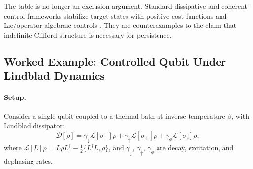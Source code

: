 \documentclass[12pt,a4paper,openany]{book}
\begin{document}
\begin{table}[h]
\centering
{}
\caption{Candidate control frameworks after separating the positive Lyapunov metric $G$ from any Clifford/read-out form $q$.}
\label{Q-B-tab:exclusion}
\end{table}

The table is no longer an exclusion argument.  Standard dissipative and coherent-control frameworks stabilize target states with positive cost functions and Lie/operator-algebraic controls \cite{Verstraete2009,Diehl2008,TicozziViola2008,Mirrahimi2005}.  They are counterexamples to the claim that indefinite Clifford structure is necessary for persistence.

\subsection{Worked Example: Controlled Qubit Under Lindblad Dynamics}
\label{Q-B-sec:toymodel}

\paragraph{Setup.}
Consider a single qubit coupled to a thermal bath at inverse temperature $\beta$, with Lindblad dissipator:
\begin{equation}
\mathcal{D}[\rho] = \gamma_\downarrow \mathcal{L}[\sigma_-]\rho + \gamma_\uparrow \mathcal{L}[\sigma_+]\rho + \gamma_\phi \mathcal{L}[\sigma_z]\rho,
\end{equation}
where $\mathcal{L}[L]\rho = L\rho L^\dagger - \frac{1}{2}\{L^\dagger L, \rho\}$, and $\gamma_\downarrow$, $\gamma_\uparrow$, $\gamma_\phi$ are decay, excitation, and dephasing rates.
\end{document}
